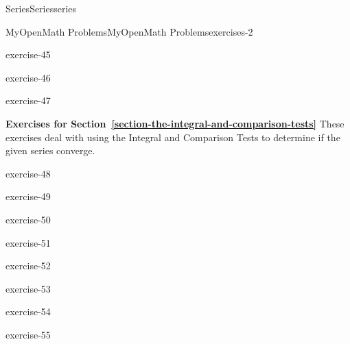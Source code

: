 \documentclass[oneside,10pt,]{book}
\numberwithin{equation}{section}
\begin{document}
\begin{chapterptx}{Series}{}{Series}{}{}{series}
\begin{exercises-section}{MyOpenMath Problems}{}{MyOpenMath Problems}{}{}{exercises-2}
\begin{exercisegroup}
\begin{divisionexerciseeg}{18}{}{}{exercise-45}
\end{divisionexerciseeg}%
\begin{divisionexerciseeg}{19}{}{}{exercise-46}%
\end{divisionexerciseeg}%
\begin{divisionexerciseeg}{20}{}{}{exercise-47}%
\end{divisionexerciseeg}%
\end{exercisegroup}
\par\medskip\noindent
\par\medskip\noindent%
\textbf{Exercises for Section~\ref*{section-the-integral-and-comparison-tests}}\space\space\hypertarget{exercisegroup-10}{}%
\hypertarget{p-986}{}%
These exercises deal with using the Integral and Comparison Tests to determine if the given series converge.%
\begin{exercisegroup}
\begin{divisionexerciseeg}{21}{}{}{exercise-48}%
\end{divisionexerciseeg}%
\begin{divisionexerciseeg}{22}{}{}{exercise-49}%
\end{divisionexerciseeg}%
\begin{divisionexerciseeg}{23}{}{}{exercise-50}%
\end{divisionexerciseeg}%
\begin{divisionexerciseeg}{24}{}{}{exercise-51}%
\end{divisionexerciseeg}%
\begin{divisionexerciseeg}{25}{}{}{exercise-52}%
\end{divisionexerciseeg}%
\begin{divisionexerciseeg}{26}{}{}{exercise-53}%
\end{divisionexerciseeg}%
\begin{divisionexerciseeg}{27}{}{}{exercise-54}%
\end{divisionexerciseeg}%
\begin{divisionexerciseeg}{28}{}{}{exercise-55}%
\end{divisionexerciseeg}%
\end{exercisegroup}
\par\medskip\noindent
\end{exercises-section}
\end{chapterptx}
%
%
\typeout{************************************************}
\typeout{************************************************}
%
\end{document}
